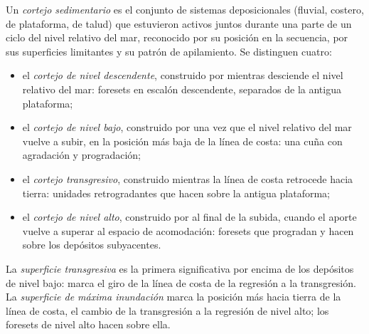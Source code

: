 \begin{definition}\label{def:b3:sequence-stratigraphy:tract}
Un \emph{cortejo sedimentario} es el conjunto de sistemas
deposicionales (fluvial, costero, de plataforma, de talud) que estuvieron activos juntos durante una
parte de un ciclo del nivel relativo del mar, reconocido por su posición en la
secuencia, por sus superficies limitantes y su patrón de apilamiento. Se distinguen
cuatro:
\begin{itemize}
\item el \emph{cortejo de nivel descendente},
  construido por  mientras desciende el nivel relativo del mar:
  foresets en escalón descendente, separados de la antigua plataforma;
\item el \emph{cortejo de nivel bajo},
  construido por  una vez que el nivel relativo del mar vuelve a subir,
  en la posición más baja de la línea de costa: una cuña con agradación y progradación;
\item el \emph{cortejo transgresivo},
  construido mientras la línea de costa retrocede hacia tierra: unidades retrogradantes
  que hacen  sobre la antigua plataforma;
\item el \emph{cortejo de nivel alto},
  construido por  al final de la subida, cuando el aporte vuelve a superar
  al espacio de acomodación: foresets que progradan y hacen  sobre los depósitos subyacentes.
\end{itemize}
\end{definition}

\begin{definition}\label{def:b3:sequence-stratigraphy:surfaces}
La \emph{superficie transgresiva} es la primera
 significativa por encima de los depósitos de nivel bajo: marca el giro
de la línea de costa de la regresión a la transgresión. La \emph{superficie de máxima
inundación} marca la posición más hacia tierra de
la línea de costa, el cambio de la transgresión a la regresión de nivel alto; los
foresets de nivel alto hacen  sobre ella.
\end{definition}

